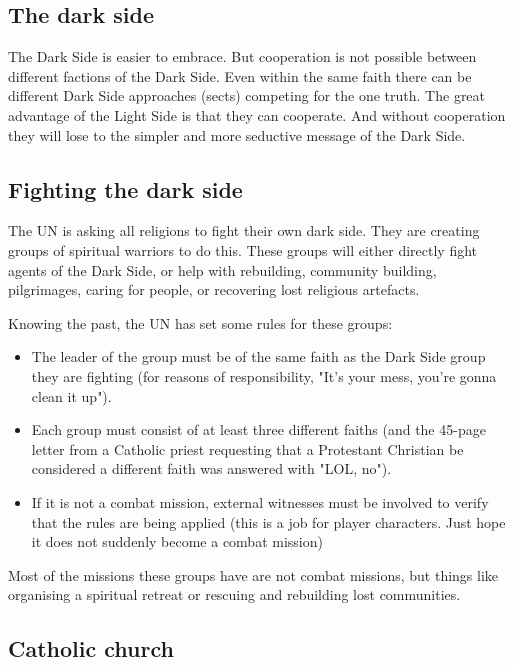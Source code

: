 \subsection{The dark side}

The Dark Side is easier to embrace. But cooperation is not possible between different factions of the Dark Side. Even within the same faith there can be different Dark Side approaches (sects) competing for the one truth.
The great advantage of the Light Side is that they can cooperate. And without cooperation they will lose to the simpler and more seductive message of the Dark Side.

\subsection{Fighting the dark side}

The UN is asking all religions to fight their own dark side. They are creating groups of spiritual warriors to do this. These groups will either directly fight agents of the Dark Side, or help with rebuilding, community building, pilgrimages, caring for people, or recovering lost religious artefacts.

Knowing the past, the UN has set some rules for these groups:

\begin{itemize}
    \item The leader of the group must be of the same faith as the Dark Side group they are fighting (for reasons of responsibility, "It's your mess, you're gonna clean it up").
    \item Each group must consist of at least three different faiths (and the 45-page letter from a Catholic priest requesting that a Protestant Christian be considered a different faith was answered with "LOL, no").
    \item If it is not a combat mission, external witnesses must be involved to verify that the rules are being applied (this is a job for player characters. Just hope it does not suddenly become a combat mission)
\end{itemize}

Most of the missions these groups have are not combat missions, but things like organising a spiritual retreat or rescuing and rebuilding lost communities.

\subsection{Catholic church}

